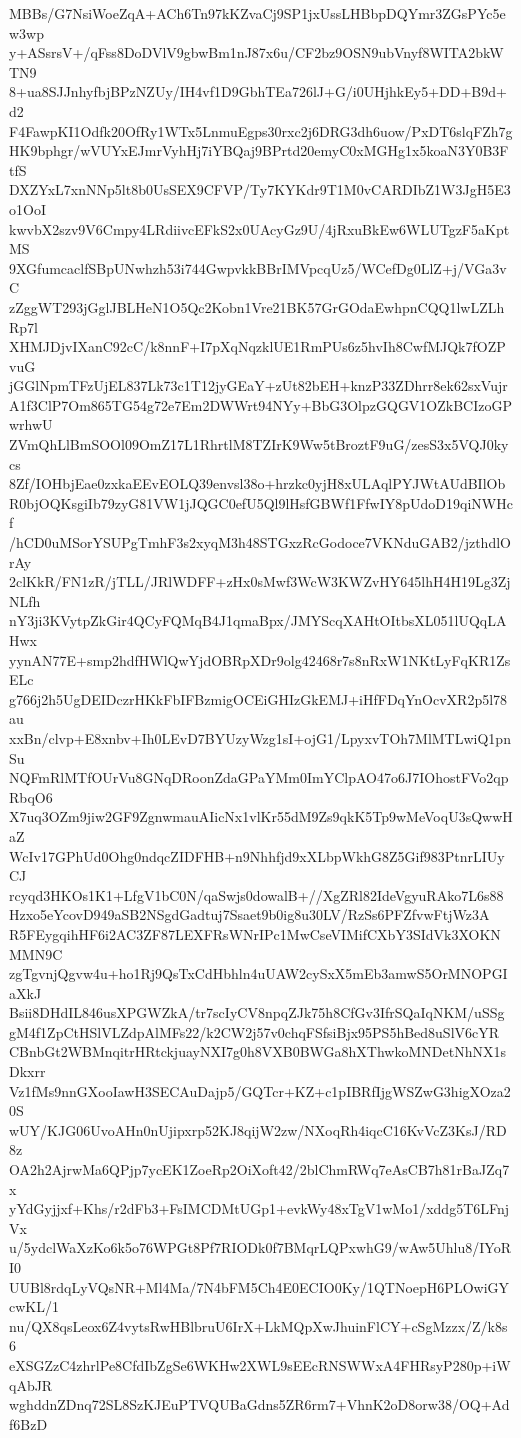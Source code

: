 MBBs/G7NsiWoeZqA+ACh6Tn97kKZvaCj9SP1jxUssLHBbpDQYmr3ZGsPYc5ew3wp
y+ASsrsV+/qFss8DoDVlV9gbwBm1nJ87x6u/CF2bz9OSN9ubVnyf8WITA2bkWTN9
8+ua8SJJnhyfbjBPzNZUy/IH4vf1D9GbhTEa726lJ+G/i0UHjhkEy5+DD+B9d+d2
F4FawpKI1Odfk20OfRy1WTx5LnmuEgps30rxc2j6DRG3dh6uow/PxDT6slqFZh7g
HK9bphgr/wVUYxEJmrVyhHj7iYBQaj9BPrtd20emyC0xMGHg1x5koaN3Y0B3FtfS
DXZYxL7xnNNp5lt8b0UsSEX9CFVP/Ty7KYKdr9T1M0vCARDIbZ1W3JgH5E3o1OoI
kwvbX2szv9V6Cmpy4LRdiivcEFkS2x0UAcyGz9U/4jRxuBkEw6WLUTgzF5aKptMS
9XGfumcaclfSBpUNwhzh53i744GwpvkkBBrIMVpcqUz5/WCefDg0LlZ+j/VGa3vC
zZggWT293jGglJBLHeN1O5Qc2Kobn1Vre21BK57GrGOdaEwhpnCQQ1lwLZLhRp7l
XHMJDjvIXanC92cC/k8nnF+I7pXqNqzklUE1RmPUs6z5hvIh8CwfMJQk7fOZPvuG
jGGlNpmTFzUjEL837Lk73c1T12jyGEaY+zUt82bEH+knzP33ZDhrr8ek62sxVujr
A1f3ClP7Om865TG54g72e7Em2DWWrt94NYy+BbG3OlpzGQGV1OZkBCIzoGPwrhwU
ZVmQhLlBmSOOl09OmZ17L1RhrtlM8TZIrK9Ww5tBroztF9uG/zesS3x5VQJ0kycs
8Zf/IOHbjEae0zxkaEEvEOLQ39envsl38o+hrzkc0yjH8xULAqlPYJWtAUdBIlOb
R0bjOQKsgiIb79zyG81VW1jJQGC0efU5Ql9lHsfGBWf1FfwIY8pUdoD19qiNWHcf
/hCD0uMSorYSUPgTmhF3s2xyqM3h48STGxzRcGodoce7VKNduGAB2/jzthdlOrAy
2clKkR/FN1zR/jTLL/JRlWDFF+zHx0sMwf3WcW3KWZvHY645lhH4H19Lg3ZjNLfh
nY3ji3KVytpZkGir4QCyFQMqB4J1qmaBpx/JMYScqXAHtOItbsXL051lUQqLAHwx
yynAN77E+smp2hdfHWlQwYjdOBRpXDr9olg42468r7s8nRxW1NKtLyFqKR1ZsELc
g766j2h5UgDEIDczrHKkFbIFBzmigOCEiGHIzGkEMJ+iHfFDqYnOcvXR2p5l78au
xxBn/clvp+E8xnbv+Ih0LEvD7BYUzyWzg1sI+ojG1/LpyxvTOh7MlMTLwiQ1pnSu
NQFmRlMTfOUrVu8GNqDRoonZdaGPaYMm0ImYClpAO47o6J7IOhostFVo2qpRbqO6
X7uq3OZm9jiw2GF9ZgnwmauAIicNx1vlKr55dM9Zs9qkK5Tp9wMeVoqU3sQwwHaZ
WcIv17GPhUd0Ohg0ndqcZIDFHB+n9Nhhfjd9xXLbpWkhG8Z5Gif983PtnrLIUyCJ
rcyqd3HKOs1K1+LfgV1bC0N/qaSwjs0dowalB+//XgZRl82IdeVgyuRAko7L6s88
Hzxo5eYcovD949aSB2NSgdGadtuj7Ssaet9b0ig8u30LV/RzSs6PFZfvwFtjWz3A
R5FEygqihHF6i2AC3ZF87LEXFRsWNrIPc1MwCseVIMifCXbY3SIdVk3XOKNMMN9C
zgTgvnjQgvw4u+ho1Rj9QsTxCdHbhln4uUAW2cySxX5mEb3amwS5OrMNOPGIaXkJ
Bsii8DHdIL846usXPGWZkA/tr7scIyCV8npqZJk75h8CfGv3IfrSQaIqNKM/uSSg
gM4f1ZpCtHSlVLZdpAlMFs22/k2CW2j57v0chqFSfsiBjx95PS5hBed8uSlV6cYR
CBnbGt2WBMnqitrHRtckjuayNXI7g0h8VXB0BWGa8hXThwkoMNDetNhNX1sDkxrr
Vz1fMs9nnGXooIawH3SECAuDajp5/GQTcr+KZ+c1pIBRfIjgWSZwG3higXOza20S
wUY/KJG06UvoAHn0nUjipxrp52KJ8qijW2zw/NXoqRh4iqcC16KvVcZ3KsJ/RD8z
OA2h2AjrwMa6QPjp7ycEK1ZoeRp2OiXoft42/2blChmRWq7eAsCB7h81rBaJZq7x
yYdGyjjxf+Khs/r2dFb3+FsIMCDMtUGp1+evkWy48xTgV1wMo1/xddg5T6LFnjVx
u/5ydclWaXzKo6k5o76WPGt8Pf7RIODk0f7BMqrLQPxwhG9/wAw5Uhlu8/IYoRI0
UUBl8rdqLyVQsNR+Ml4Ma/7N4bFM5Ch4E0ECIO0Ky/1QTNoepH6PLOwiGYcwKL/1
nu/QX8qsLeox6Z4vytsRwHBlbruU6IrX+LkMQpXwJhuinFlCY+cSgMzzx/Z/k8s6
eXSGZzC4zhrlPe8CfdIbZgSe6WKHw2XWL9sEEcRNSWWxA4FHRsyP280p+iWqAbJR
wghddnZDnq72SL8SzKJEuPTVQUBaGdns5ZR6rm7+VhnK2oD8orw38/OQ+Adf6BzD
